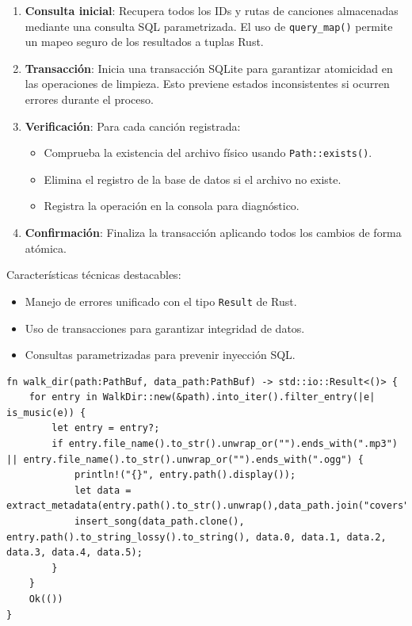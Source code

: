 \documentclass[11pt, a4paper]{article}
\begin{document}
            \begin{enumerate}
              \item \textbf{Consulta inicial}: Recupera todos los IDs y rutas de canciones almacenadas mediante una consulta SQL parametrizada. El uso de \texttt{query\_map()} permite un mapeo seguro de los resultados a tuplas Rust.

              \item \textbf{Transacción}: Inicia una transacción SQLite para garantizar atomicidad en las operaciones de limpieza. Esto previene estados inconsistentes si ocurren errores durante el proceso.

              \item \textbf{Verificación}: Para cada canción registrada:
                \begin{itemize}
                  \item Comprueba la existencia del archivo físico usando \texttt{Path::exists()}.
                  \item Elimina el registro de la base de datos si el archivo no existe.
                  \item Registra la operación en la consola para diagnóstico.
                \end{itemize}

              \item \textbf{Confirmación}: Finaliza la transacción aplicando todos los cambios de forma atómica.
            \end{enumerate}

            Características técnicas destacables:
            \begin{itemize}
              \item Manejo de errores unificado con el tipo \texttt{Result} de Rust.
              \item Uso de transacciones para garantizar integridad de datos.
              \item Consultas parametrizadas para prevenir inyección SQL.
            \end{itemize}

            \begin{lstlisting}[caption={fn walk\_dir()}]
 fn walk_dir(path:PathBuf, data_path:PathBuf) -> std::io::Result<()> {
    for entry in WalkDir::new(&path).into_iter().filter_entry(|e| is_music(e)) {
        let entry = entry?;
        if entry.file_name().to_str().unwrap_or("").ends_with(".mp3") || entry.file_name().to_str().unwrap_or("").ends_with(".ogg") {
            println!("{}", entry.path().display());
            let data = extract_metadata(entry.path().to_str().unwrap(),data_path.join("covers"))?;
            insert_song(data_path.clone(), entry.path().to_string_lossy().to_string(), data.0, data.1, data.2, data.3, data.4, data.5);
        }
    }
    Ok(())
}
            \end{lstlisting}
\end{document}
